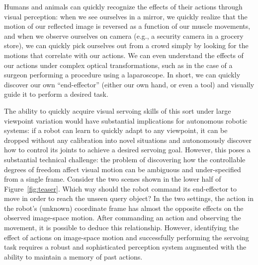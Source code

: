 \documentclass[10pt,twocolumn,letterpaper]{article}
\begin{document}
Humans and animals can quickly recognize the effects of their actions through visual perception: when we see ourselves in a mirror, we quickly realize that the motion of our reflected image is reversed as a function of our muscle movements, and when we observe ourselves on camera (e.g., a security camera in a grocery store), we can quickly pick ourselves out from a crowd simply by looking for the motions that correlate with our actions. We can even understand the effects of our actions under complex optical transformations, such as in the case of a surgeon performing a procedure using a laparoscope. In short, we can quickly discover our own ``end-effector'' (either our own hand, or even a tool) and visually guide it to perform a desired task.


The ability to quickly acquire visual servoing skills of this sort under large viewpoint variation would have substantial implications for autonomous robotic systems: if a robot can learn to quickly adapt to any viewpoint, it can be dropped without any calibration into novel situations and autonomously discover how to control its joints to achieve a desired servoing goal. However, this poses a substantial technical challenge: the problem of discovering how the controllable degrees of freedom affect visual motion can be ambiguous and under-specified from a single frame. Consider the two scenes shown in the lower half of Figure~\ref{fig:teaser}. Which way should the robot command its end-effector to move in order to reach the unseen query object? In the two settings, the action in the robot's (unknown) coordinate frame has almost the opposite effects on the observed image-space motion.
After commanding an action and observing the movement, it is possible to deduce this relationship. However, identifying the effect of actions on image-space motion and successfully performing the servoing task requires a robust and sophisticated perception system augmented with the ability to maintain a memory of past actions.
\end{document}

